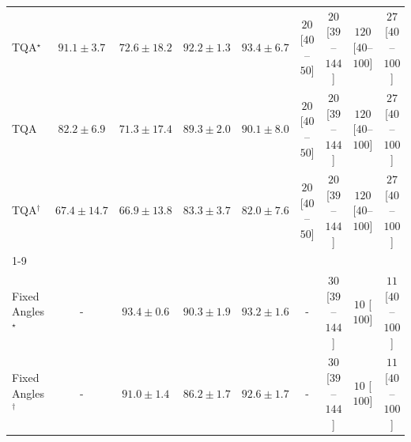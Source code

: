 \begin{tabular}{l|cccc|cccc|}
TQA$^\star$ & {\cellcolor[HTML]{A33904}} \color[HTML]{F1F1F1} $91.1\pm 3.7$ & {\cellcolor[HTML]{FEAB39}} \color[HTML]{000000} $72.6\pm 18.2$ & {\cellcolor[HTML]{993404}} \color[HTML]{F1F1F1} $92.2\pm 1.3$ & {\cellcolor[HTML]{8E3104}} \color[HTML]{F1F1F1} $93.4\pm 6.7$ & {\cellcolor[HTML]{FFF4F0}} \color[HTML]{000000} $20$ [$40$--$50$] & {\cellcolor[HTML]{FFF4F0}} \color[HTML]{000000} $20$ [$39$--$144$] & {\cellcolor[HTML]{FDDCD8}} \color[HTML]{000000} $120$ [$40$--$100$] & {\cellcolor[HTML]{FFF3EF}} \color[HTML]{000000} $27$ [$40$--$100$] \\
TQA & {\cellcolor[HTML]{E3660F}} \color[HTML]{F1F1F1} $82.2\pm 6.9$ & {\cellcolor[HTML]{FEB541}} \color[HTML]{000000} $71.3\pm 17.4$ & {\cellcolor[HTML]{B34003}} \color[HTML]{F1F1F1} $89.3\pm 2.0$ & {\cellcolor[HTML]{AB3C03}} \color[HTML]{F1F1F1} $90.1\pm 8.0$ & {\cellcolor[HTML]{FFF4F0}} \color[HTML]{000000} $20$ [$40$--$50$] & {\cellcolor[HTML]{FFF4F0}} \color[HTML]{000000} $20$ [$39$--$144$] & {\cellcolor[HTML]{FDDCD8}} \color[HTML]{000000} $120$ [$40$--$100$] & {\cellcolor[HTML]{FFF3EF}} \color[HTML]{000000} $27$ [$40$--$100$] \\
TQA$^\dagger$ & {\cellcolor[HTML]{FECD63}} \color[HTML]{000000} $67.4\pm 14.7$ & {\cellcolor[HTML]{FED069}} \color[HTML]{000000} $66.9\pm 13.8$ & {\cellcolor[HTML]{DD5F0C}} \color[HTML]{F1F1F1} $83.3\pm 3.7$ & {\cellcolor[HTML]{E46710}} \color[HTML]{F1F1F1} $82.0\pm 7.6$ & {\cellcolor[HTML]{FFF4F0}} \color[HTML]{000000} $20$ [$40$--$50$] & {\cellcolor[HTML]{FFF4F0}} \color[HTML]{000000} $20$ [$39$--$144$] & {\cellcolor[HTML]{FDDCD8}} \color[HTML]{000000} $120$ [$40$--$100$] & {\cellcolor[HTML]{FFF3EF}} \color[HTML]{000000} $27$ [$40$--$100$] \\
\cline{1-9}
\multicolumn{9}{c}{\rule{0pt}{8pt}PP} \\
\midrule
Fixed Angles$^\star$ & {\cellcolor[HTML]{000000}} \color[HTML]{F1F1F1} {\cellcolor{white}} \color{black} - & {\cellcolor[HTML]{006034}} \color[HTML]{F1F1F1} $93.4\pm 0.6$ & {\cellcolor[HTML]{0B713B}} \color[HTML]{F1F1F1} $90.3\pm 1.9$ & {\cellcolor[HTML]{006234}} \color[HTML]{F1F1F1} $93.2\pm 1.6$ & {\cellcolor[HTML]{000000}} \color[HTML]{F1F1F1} {\cellcolor{white}} \color{black} - & {\cellcolor[HTML]{FFF2EE}} \color[HTML]{000000} $30$ [$39$--$144$] & {\cellcolor[HTML]{FFF7F3}} \color[HTML]{000000} $10$ [$100$] & {\cellcolor[HTML]{FFF6F2}} \color[HTML]{000000} $11$ [$40$--$100$] \\
Fixed Angles$^\dagger$ & {\cellcolor[HTML]{000000}} \color[HTML]{F1F1F1} {\cellcolor{white}} \color{black} - & {\cellcolor[HTML]{076D39}} \color[HTML]{F1F1F1} $91.0\pm 1.4$ & {\cellcolor[HTML]{248644}} \color[HTML]{F1F1F1} $86.2\pm 1.7$ & {\cellcolor[HTML]{006536}} \color[HTML]{F1F1F1} $92.6\pm 1.7$ & {\cellcolor[HTML]{000000}} \color[HTML]{F1F1F1} {\cellcolor{white}} \color{black} - & {\cellcolor[HTML]{FFF2EE}} \color[HTML]{000000} $30$ [$39$--$144$] & {\cellcolor[HTML]{FFF7F3}} \color[HTML]{000000} $10$ [$100$] & {\cellcolor[HTML]{FFF6F2}} \color[HTML]{000000} $11$ [$40$--$100$] \\

\end{tabular}

